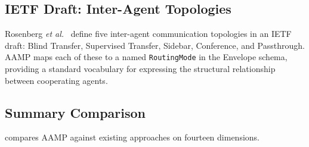 \documentclass[11pt,a4paper]{article}
\begin{document}
\subsection{IETF Draft: Inter-Agent Topologies}

Rosenberg \emph{et al.}~\cite{rosenberg2024} define five inter-agent communication
topologies in an IETF draft: Blind Transfer, Supervised Transfer, Sidebar, Conference,
and Passthrough. AAMP maps each of these to a named \texttt{RoutingMode} in the
Envelope schema, providing a standard vocabulary for expressing the structural
relationship between cooperating agents.

\subsection{Summary Comparison}

 compares AAMP against existing approaches on fourteen dimensions.
\end{document}
